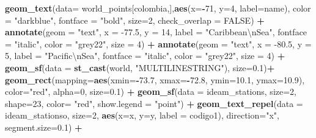 \documentclass[12pt,twoside]{reedthesis}
\newenvironment{Shaded}{\begin{snugshade}}{\end{snugshade}}
\newcommand{\CharTok}[1]{\textcolor[rgb]{0.31,0.60,0.02}{#1}}
\newcommand{\DataTypeTok}[1]{\textcolor[rgb]{0.13,0.29,0.53}{#1}}
\newcommand{\DecValTok}[1]{\textcolor[rgb]{0.00,0.00,0.81}{#1}}
\newcommand{\FloatTok}[1]{\textcolor[rgb]{0.00,0.00,0.81}{#1}}
\newcommand{\KeywordTok}[1]{\textcolor[rgb]{0.13,0.29,0.53}{\textbf{#1}}}
\newcommand{\NormalTok}[1]{#1}
\newcommand{\OperatorTok}[1]{\textcolor[rgb]{0.81,0.36,0.00}{\textbf{#1}}}
\newcommand{\OtherTok}[1]{\textcolor[rgb]{0.56,0.35,0.01}{#1}}
\newcommand{\StringTok}[1]{\textcolor[rgb]{0.31,0.60,0.02}{#1}}
\begin{document}
\begin{Shaded}
\begin{Highlighting}[]
{{{{\StringTok{  }\KeywordTok{geom_text}\NormalTok{(}\DataTypeTok{data=}\NormalTok{ world_points[colombia,],}\KeywordTok{aes}\NormalTok{(}\DataTypeTok{x=}\OperatorTok{-}\DecValTok{71}\NormalTok{, }\DataTypeTok{y=}\DecValTok{4}\NormalTok{, }\DataTypeTok{label=}\NormalTok{name), }\DataTypeTok{color =} \StringTok{"darkblue"}\NormalTok{, }\DataTypeTok{fontface =} \StringTok{"bold"}\NormalTok{, }\DataTypeTok{size=}\DecValTok{2}\NormalTok{, }\DataTypeTok{check_overlap =} \OtherTok{FALSE}\NormalTok{) }\OperatorTok{+}
\StringTok{  }\KeywordTok{annotate}\NormalTok{(}\DataTypeTok{geom =} \StringTok{"text"}\NormalTok{, }\DataTypeTok{x =} \FloatTok{-77.5}\NormalTok{, }\DataTypeTok{y =} \DecValTok{14}\NormalTok{, }\DataTypeTok{label =} \StringTok{"Caribbean}\CharTok{\textbackslash{}n}\StringTok{Sea"}\NormalTok{, }\DataTypeTok{fontface =} \StringTok{"italic"}\NormalTok{, }\DataTypeTok{color =} \StringTok{"grey22"}\NormalTok{, }\DataTypeTok{size =} \DecValTok{4}\NormalTok{) }\OperatorTok{+}\StringTok{ }
\StringTok{  }\KeywordTok{annotate}\NormalTok{(}\DataTypeTok{geom =} \StringTok{"text"}\NormalTok{, }\DataTypeTok{x =} \FloatTok{-80.5}\NormalTok{, }\DataTypeTok{y =} \DecValTok{5}\NormalTok{, }\DataTypeTok{label =} \StringTok{"Pacific}\CharTok{\textbackslash{}n}\StringTok{Sea"}\NormalTok{, }\DataTypeTok{fontface =} \StringTok{"italic"}\NormalTok{, }\DataTypeTok{color =} \StringTok{"grey22"}\NormalTok{, }\DataTypeTok{size =} \DecValTok{4}\NormalTok{) }\OperatorTok{+}
\StringTok{  }\KeywordTok{geom_sf}\NormalTok{(}\DataTypeTok{data =} \KeywordTok{st_cast}\NormalTok{(world, }\StringTok{"MULTILINESTRING"}\NormalTok{), }\DataTypeTok{size=}\FloatTok{0.1}\NormalTok{)}\OperatorTok{+}
\StringTok{  }\KeywordTok{geom_rect}\NormalTok{(}\DataTypeTok{mapping=}\KeywordTok{aes}\NormalTok{(}\DataTypeTok{xmin=}\OperatorTok{-}\FloatTok{73.7}\NormalTok{, }\DataTypeTok{xmax=}\OperatorTok{-}\FloatTok{72.8}\NormalTok{, }\DataTypeTok{ymin=}\FloatTok{10.1}\NormalTok{, }\DataTypeTok{ymax=}\FloatTok{10.9}\NormalTok{), }\DataTypeTok{color=}\StringTok{"red"}\NormalTok{, }\DataTypeTok{alpha=}\DecValTok{0}\NormalTok{, }\DataTypeTok{size=}\FloatTok{0.1}\NormalTok{) }\OperatorTok{+}
\StringTok{  }\KeywordTok{geom_sf}\NormalTok{(}\DataTypeTok{data =}\NormalTok{ ideam_stations, }\DataTypeTok{size=}\DecValTok{2}\NormalTok{, }\DataTypeTok{shape=}\DecValTok{23}\NormalTok{, }\DataTypeTok{color=} \StringTok{"red"}\NormalTok{, }\DataTypeTok{show.legend =} \StringTok{"point"}\NormalTok{) }\OperatorTok{+}\StringTok{ }
\StringTok{  }\KeywordTok{geom_text_repel}\NormalTok{(}\DataTypeTok{data =}\NormalTok{ ideam_stationso, }\DataTypeTok{size=}\DecValTok{2}\NormalTok{, }\KeywordTok{aes}\NormalTok{(}\DataTypeTok{x=}\NormalTok{x, }\DataTypeTok{y=}\NormalTok{y, }\DataTypeTok{label =}\NormalTok{ codigo1), }\DataTypeTok{direction=}\StringTok{"x"}\NormalTok{, }\DataTypeTok{segment.size=}\FloatTok{0.1}\NormalTok{) }\OperatorTok{+}
}}}}
\end{Highlighting}
\end{Shaded}
\end{document}
